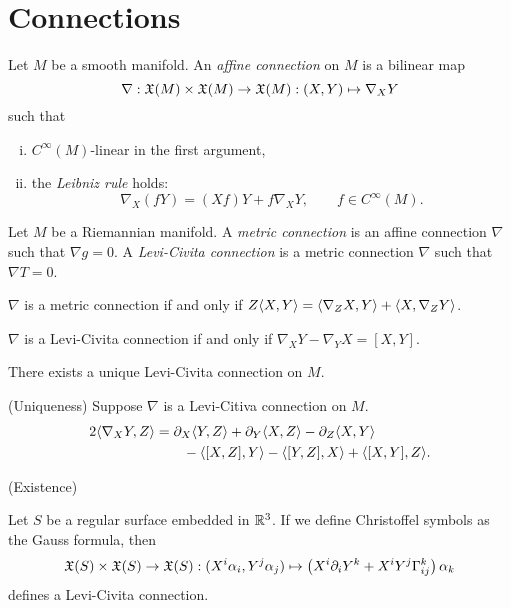 \documentclass{../../large}
\renewcommand{\a}{\alpha}
\begin{document}
\section{Connections}

\begin{prb}
Let $M$ be a smooth manifold.
An \emph{affine connection} on $M$ is a bilinear map
\[\nabla:\mathfrak{X}(M)\times\mathfrak{X}(M)\to\mathfrak{X}(M):(X,Y)\mapsto\nabla_XY\]
such that
\begin{enumerate}[(i)]
\item $C^\infty(M)$-linear in the first argument,
\item the \emph{Leibniz rule} holds:
\[\nabla_X(fY)=(Xf)Y+f\nabla_XY,\qquad f\in C^\infty(M).\]
\end{enumerate}
\end{prb}

\begin{prb}
Let $M$ be a Riemannian manifold.
A \emph{metric connection} is an affine connection $\nabla$ such that $\nabla g=0$.
A \emph{Levi-Civita connection} is a metric connection $\nabla$ such that $\nabla T=0$.
\begin{parts}
\item $\nabla$ is a metric connection if and only if $Z\langle X,Y\rangle=\langle\nabla_ZX,Y\rangle+\langle X,\nabla_ZY\rangle$.
\item $\nabla$ is a Levi-Civita connection if and only if $\nabla_XY-\nabla_YX=[X,Y]$.
\item There exists a unique Levi-Civita connection on $M$.
\end{parts}
\end{prb}
\begin{pf}
(Uniqueness)
Suppose $\nabla$ is a Levi-Citiva connection on $M$.
\begin{align*}
2\<\nabla_XY,Z\>&=\pd_X\<Y,Z\>+\pd_Y\<X,Z\>-\pd_Z\<X,Y\>\\
&\qquad-\<[X,Z],Y\>-\<[Y,Z],X\>+\<[X,Y],Z\>.
\end{align*}

(Existence)
\end{pf}

\begin{prb}
Let $S$ be a regular surface embedded in $\mathbb{R}^3$.
If we define Christoffel symbols as the Gauss formula, then
\[\fX(S)\times\fX(S)\to\fX(S):(X^i\a_i,Y^j\a_j)\mapsto\left(X^i\pd_iY^k+X^iY^j\Gamma_{ij}^k\right)\a_k\]
defines a Levi-Civita connection.
\end{prb}


\begin{prb}

\end{prb}
\end{document}
